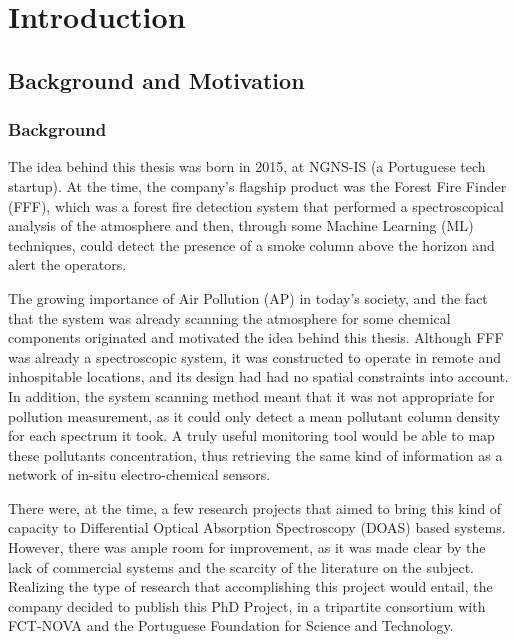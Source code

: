 \newcommand{\novathesis}{\emph{novathesis}}
\newcommand{\novathesisclass}{\texttt{novathesis.cls}}


\chapter{Introduction}
\label{cha:introduction}

\section{Background and Motivation}%
\label{sec:bg_and_motivation}

\subsection{Background}%
\label{sub:background}

The idea behind this thesis was born in 2015, at NGNS-IS (a Portuguese
tech startup). At the time, the company's flagship product was the
Forest Fire Finder (\gls{FFF}), which was a forest fire detection system
that performed a spectroscopical analysis of the atmosphere and then,
through some Machine Learning (\gls{ML}) techniques, could detect the
presence of a smoke column above the horizon and alert the operators.

The growing importance of Air Pollution (\gls{AP}) in today's society,
and the fact that the system was already scanning the atmosphere for
some chemical components originated and motivated the idea behind this
thesis. Although \gls{FFF} was already a spectroscopic system, it was
constructed to operate in remote and inhospitable locations, and its
design had had no spatial constraints into account. In addition, the
system scanning method meant that it was not appropriate for pollution
measurement, as it could only detect a mean pollutant column density for
each spectrum it took. A truly useful monitoring tool would be able to
map these pollutants concentration, thus retrieving the same kind of
information as a network of in-situ electro-chemical sensors.

There were, at the time, a few research projects that aimed to bring
this kind of capacity to Differential Optical Absorption Spectroscopy
(\gls{DOAS}) based systems. However, there was ample room for
improvement, as it was made clear by the lack of commercial systems and
the scarcity of the literature on the subject. Realizing the type of
research that accomplishing this project would entail, the company
decided to publish this PhD Project, in a tripartite consortium with
FCT-NOVA and the Portuguese Foundation for Science and Technology.

